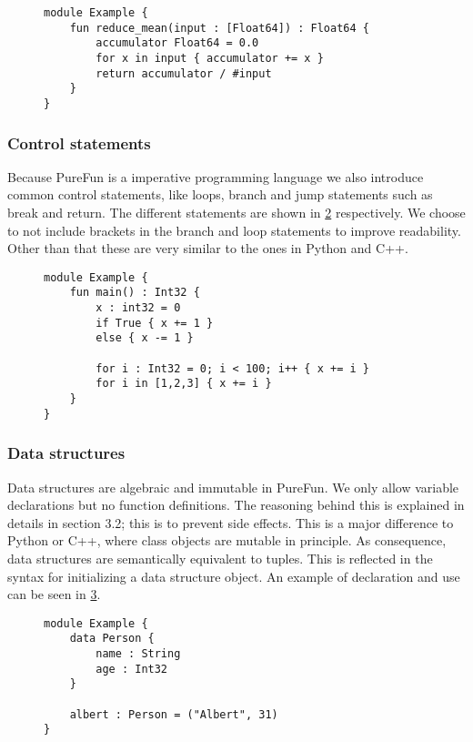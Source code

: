 \begin{figure}
	\label{lst:simple_ex}\begin{lstlisting}[caption={A simple example calculating the mean for a sequence of double precision floating point values in PureFun.}]
module Example {
	fun reduce_mean(input : [Float64]) : Float64 {
		accumulator Float64 = 0.0
		for x in input { accumulator += x }
		return accumulator / #input
	}
}
	\end{lstlisting}
\end{figure} 

\subsubsection{Control statements} Because PureFun is a imperative programming language we also introduce common control statements, like loops, branch and jump statements such as break and return. The different statements are shown in \ref{lst:ex_flow} respectively. We choose to not include brackets in the branch and loop statements to improve readability. Other than that these are very similar to the ones in Python and C++.

\begin{figure}
	\label{lst:ex_flow}\begin{lstlisting}[caption={Some examples of control statements in PureFun}]
module Example {
	fun main() : Int32 {
		x : int32 = 0
		if True { x += 1 }
		else { x -= 1 }
		
		for i : Int32 = 0; i < 100; i++ { x += i }
		for i in [1,2,3] { x += i }
	}
}
	\end{lstlisting}
\end{figure}

\subsubsection{Data structures} Data structures are algebraic and immutable in PureFun. We only allow variable declarations but no function definitions. The reasoning behind this is explained in details in section 3.2; this is to prevent side effects. This is a major difference to Python or C++, where class objects are mutable in principle. As consequence, data structures are semantically equivalent to tuples. This is reflected in the syntax for initializing a data structure object. An example of declaration and use can be seen in \ref{lst:data}.

\begin{figure}
	\label{lst:data}\begin{lstlisting}[caption={Some examples of control statements in PureFun}]
module Example {
	data Person {
		name : String
		age : Int32
	}
	
	albert : Person = ("Albert", 31)
}
	\end{lstlisting}
\end{figure}

